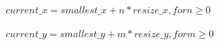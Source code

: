 \documentclass{article}
\begin{document}
$current\_x = smallest\_x + n * resize\_x, for n \geq 0$
\pagebreak

$current\_y = smallest\_y + m * resize\_y, for m \geq 0$
\pagebreak
\end{document}
